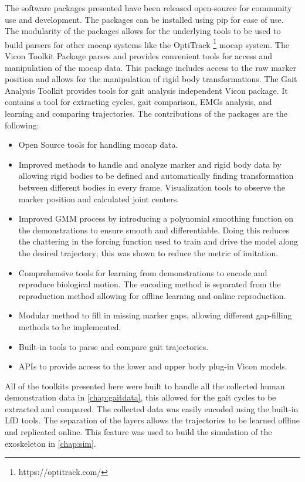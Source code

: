 The software packages presented have been released open-source for community use and development. The packages can be installed using pip for ease of use. The modularity of the packages allows for the underlying tools to be used to build parsers for other mocap systems like the OptiTrack \footnote{https://optitrack.com/} mocap system. The Vicon Toolkit Package parses and provides convenient tools for access and manipulation of the mocap data. This package includes access to the raw marker position and allows for the manipulation of rigid body transformations. The Gait Analysis Toolkit provides tools for gait analysis independent Vicon package.  It contains a tool for extracting cycles, gait comparison, EMGs analysis, and learning and comparing trajectories. The contributions of the packages are the following:

\begin{itemize}
    \item Open Source tools for handling mocap data.
    \item Improved methods to handle and analyze marker and rigid body data by allowing rigid bodies to be defined and automatically finding transformation between different bodies in every frame.
    \iten Visualization tools to observe the marker position and calculated joint centers. 
    \item Improved GMM process by introducing a polynomial smoothing function on the demonstrations to ensure smooth and differentiable. Doing this reduces the chattering in the forcing function used to train and drive the model along the desired trajectory; this was shown to reduce the metric of imitation.
    \item Comprehensive tools for learning from demonstrations to encode and reproduce biological motion. The encoding method is separated from the reproduction method allowing for offline learning and online reproduction.
    \item Modular method to fill in missing marker gaps, allowing different gap-filling methods to be implemented. 
    \item Built-in tools to parse and compare gait trajectories. 
    \item APIs to provide access to the lower and upper body plug-in Vicon models. 
\end{itemize}

All of the toolkits presented here were built to handle all the collected human demonstration data in \autoref{chap:gaitdata}, this allowed for the gait cycles to be extracted and compared. The collected data was easily encoded using the built-in LfD tools. The separation of the layers allows the trajectories to be learned offline and replicated online. This feature was used to build the simulation of the exoskeleton in \autoref{chap:sim}.


